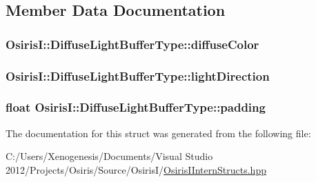 \subsection{Member Data Documentation}
\hypertarget{struct_osiris_i_1_1_diffuse_light_buffer_type_a7be9ffd12a512b06196cae9225889886}{
\subsubsection[{diffuse\-Color}]{ Osiris\-I\-::\-Diffuse\-Light\-Buffer\-Type\-::diffuse\-Color}}\label{struct_osiris_i_1_1_diffuse_light_buffer_type_a7be9ffd12a512b06196cae9225889886}
\hypertarget{struct_osiris_i_1_1_diffuse_light_buffer_type_a5b065d94c163ea68510f8b2c1f93144e}{
\subsubsection[{light\-Direction}]{ Osiris\-I\-::\-Diffuse\-Light\-Buffer\-Type\-::light\-Direction}}\label{struct_osiris_i_1_1_diffuse_light_buffer_type_a5b065d94c163ea68510f8b2c1f93144e}
\hypertarget{struct_osiris_i_1_1_diffuse_light_buffer_type_a8dfd780889813b335b7ef9cf8ec9227a}{
\subsubsection[{padding}]{\setlength{\rightskip}{0pt plus 5cm}float Osiris\-I\-::\-Diffuse\-Light\-Buffer\-Type\-::padding}}\label{struct_osiris_i_1_1_diffuse_light_buffer_type_a8dfd780889813b335b7ef9cf8ec9227a}


The documentation for this struct was generated from the following file\-:\begin{DoxyCompactItemize}
\item 
C\-:/\-Users/\-Xenogenesis/\-Documents/\-Visual Studio 2012/\-Projects/\-Osiris/\-Source/\-Osiris\-I/\hyperlink{_osiris_i_intern_structs_8hpp}{Osiris\-I\-Intern\-Structs.\-hpp}\end{DoxyCompactItemize}
